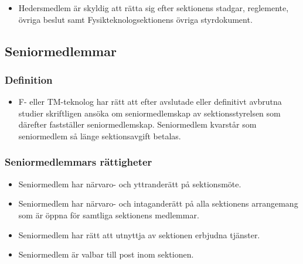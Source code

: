 \documentclass[11pt,a4paper]{article}
\begin{document}
\begin{itemize}


\item Hedersmedlem är skyldig att rätta sig efter sektionens stadgar,
   regle\-mente, övriga beslut samt  Fysikteknologsektionens övriga styrdokument.
   
\end{itemize}




\subsection{Seniormedlemmar}

\subsubsection{Definition}

\begin{itemize}

  \item F- eller TM-teknolog har rätt att efter avslutade eller definitivt
  avbrutna studier skriftligen ansöka om seniormedlemskap av sektionsstyrelsen
  som därefter fastställer seniormedlemskap. Seniormedlem kvarstår som
  senior\-med\-lem så länge sektionsavgift betalas.

\end{itemize}

\subsubsection{Seniormedlemmars rättigheter}

\begin{itemize}

   \item Seniormedlem har närvaro- och yttranderätt på sektionsmöte.

   \item Seniormedlem har närvaro- och intaganderätt på alla
   sektionens arrangemang som är öppna för samtliga sektionens
   medlemmar.

   \item Seniormedlem har rätt att utnyttja av sektionen erbjudna
   tjänster.
   
   \item Seniormedlem är valbar till post inom sektionen.

\end{itemize}
\end{document}
